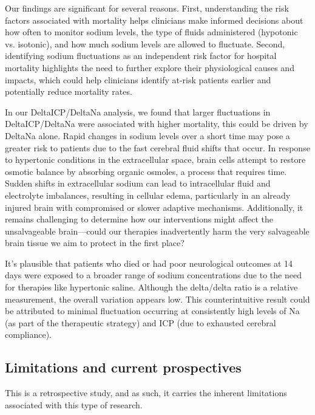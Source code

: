 Our findings are significant for several reasons. First, understanding the risk factors associated with mortality helps clinicians make informed decisions about how often to monitor sodium levels, the type of fluids administered (hypotonic vs. isotonic), and how much sodium levels are allowed to fluctuate. Second, identifying sodium fluctuations as an independent risk factor for hospital mortality highlights the need to further explore their physiological causes and impacts, which could help clinicians identify at-risk patients earlier and potentially reduce mortality rates.

In our DeltaICP/DeltaNa analysis, we found that larger fluctuations in DeltaICP/DeltaNa were associated with higher mortality, this could be driven by DeltaNa alone. Rapid changes in sodium levels over a short time may pose a greater risk to patients due to the fast cerebral fluid shifts that occur. In response to hypertonic conditions in the extracellular space, brain cells attempt to restore osmotic balance by absorbing organic osmoles, a process that requires time. Sudden shifts in extracellular sodium can lead to intracellular fluid and electrolyte imbalances, resulting in cellular edema, particularly in an already injured brain with compromised or slower adaptive mechanisms. Additionally, it remains challenging to determine how our interventions might affect the unsalvageable brain—could our therapies inadvertently harm the very salvageable brain tissue we aim to protect in the first place?

It’s plausible that patients who died or had poor neurological outcomes at 14 days were exposed to a broader range of sodium concentrations due to the need for therapies like hypertonic saline. Although the delta/delta ratio is a relative measurement, the overall variation appears low. This counterintuitive result could be attributed to minimal fluctuation occurring at consistently high levels of Na (as part of the therapeutic strategy) and ICP (due to exhausted cerebral compliance).


\subsection{Limitations and current prospectives}
This is a retrospective study, and as such, it carries the inherent limitations associated with this type of research.

